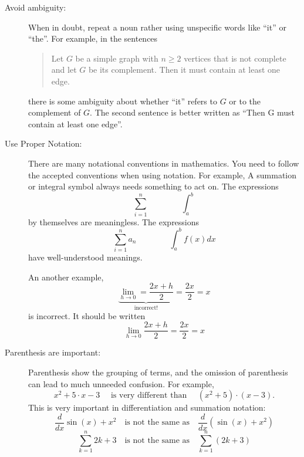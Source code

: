 \begin{description}
        \item[Avoid ambiguity:] When in doubt, repeat a noun rather using unspecific words
        like ``it'' or ``the''. For example, in the sentences
        \begin{quote}
            Let $G$ be a simple graph with $n \ge 2$ vertices that is not complete and let
            $G$ be its complement. Then it must contain at least one edge.
        \end{quote}
        there is some ambiguity about whether ``it'' refers to $G$ or to the complement of
        $G$. The second sentence is better written as ``Then G must contain at least one
        edge''.

    \item[Use Proper Notation:] There are many notational conventions in mathematics.
        You need to follow the accepted conventions when using notation. For example, A
        summation or integral symbol always needs something to act on. The expressions 
        \[ \sum_{i=1}^n \qquad \qquad \int_a^b \]
        by themselves are meaningless.  The expressions
        \[ \sum_{i=1}^n a_n \qquad \qquad \int_a^b f(x) dx \]
        have well-understood meanings.

        An another example,
        \[ \underbrace{\lim_{h \to 0} = \frac{2x+h}{2}}_{\text{incorrect!}} = \frac{2x}{2} = x \]
        is incorrect.  It should be written
        \[ \lim_{h \to 0} \frac{2x+h}{2} = \frac{2x}{2} = x \]


    \item[Parenthesis are important:] Parenthesis show the grouping of terms, and the
        omission of parenthesis can lead to much unneeded confusion.  For example,
        \[ x^2 + 5 \cdot x-3 \quad \text{ is very different than } \quad \left( x^2 + 5
            \right) \cdot \left( x-3 \right). \]
        This is very important in differentiation and summation notation:
        \[ \frac{d}{dx} \sin(x) + x^2 \quad \text{is not the same as} \quad \frac{d}{dx}
            \left( \sin(x) + x^2 \right) \]
        \[ \sum_{k=1}^n 2k+3 \quad \text{is not the same as} \quad \sum_{k=1}^n \left(
            2k+3 \right) \]


\end{description}

